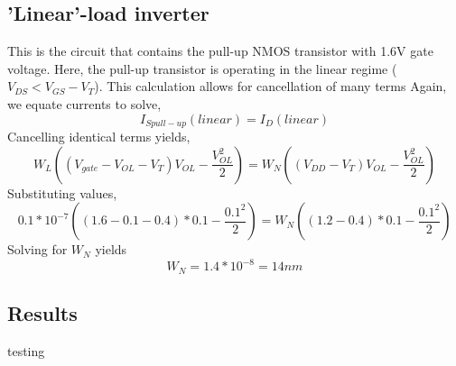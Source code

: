 \documentclass[12pt]{article}
\begin{document}
\subsection*{'Linear'-load inverter}
This is the circuit that contains the pull-up NMOS transistor with 1.6V gate voltage. Here, the pull-up transistor
is operating in the linear regime ($V_{DS} < V_{GS} - V_T$). This calculation allows for cancellation of many terms
Again, we equate currents to solve,
\[ I_{S pull-up}(linear) = I_{D}(linear)\]
Cancelling identical terms yields,
\[W_L ((V_{gate} - V_{OL} - V_T) V_{OL} - \frac{V_{OL}^2}{2}) = W_N ((V_{DD} - V_T) V_{OL} - \frac{V_{OL}^2}{2}) \]
Substituting values,
\[0.1*10^{-7} ((1.6 - 0.1 - 0.4)*0.1 - \frac{0.1^2}{2}) = W_N ((1.2 - 0.4)*0.1 - \frac{0.1^2}{2}) \]
Solving for $W_N$ yields 
\[ W_N = 1.4*10^{-8} = 14nm\]

\subsection{Results}
testing
\pagebreak
\end{document}
